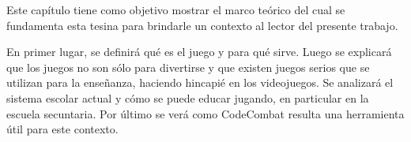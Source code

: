 Este capítulo tiene como objetivo mostrar el marco teórico del cual se fundamenta esta tesina para brindarle un contexto al lector del presente trabajo. 

En primer lugar, se definirá qué es el juego y para qué sirve. Luego se explicará que los juegos no son sólo para divertirse y que existen juegos serios que se utilizan para la enseñanza, haciendo hincapié en los videojuegos. Se analizará el sistema escolar actual y cómo se puede educar jugando, en particular en la escuela secuntaria. Por último se verá como CodeCombat resulta una herramienta útil para este contexto.